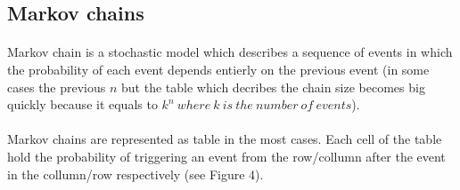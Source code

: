 \documentclass[]{article}
\begin{document}
        \subsection{Markov chains}
        \paragraph{}Markov chain is a stochastic model which describes a sequence of events in which the probability of each event depends entierly on the previous event (in some cases the previous $n$ but the table which decribes the chain size becomes big quickly because it equals to $k^n\ where\ k\ is\ the\ number\ of\ events$).\paragraph{}
                Markov chains are represented as table in the most cases. Each cell of the table hold the probability of triggering an event from the row/collumn after the event in the collumn/row respectively (see Figure 4).
\end{document}
